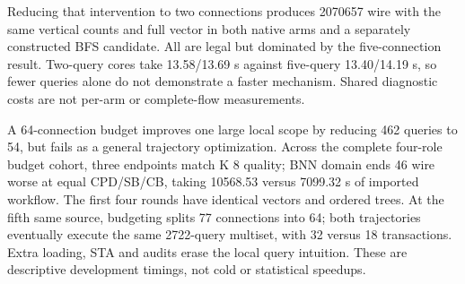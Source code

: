 Reducing that intervention to two connections produces 2070657 wire with the same vertical counts and full vector in both native arms and a separately constructed BFS candidate. All are legal but dominated by the five-connection result. Two-query cores take 13.58/13.69 s against five-query 13.40/14.19 s, so fewer queries alone do not demonstrate a faster mechanism. Shared diagnostic costs are not per-arm or complete-flow measurements.

A 64-connection budget improves one large local scope by reducing 462 queries to 54, but fails as a general trajectory optimization. Across the complete four-role budget cohort, three endpoints match K 8 quality; BNN domain ends 46 wire worse at equal CPD/SB/CB, taking 10568.53 versus 7099.32 s of imported workflow. The first four rounds have identical vectors and ordered trees. At the fifth same source, budgeting splits 77 connections into 64; both trajectories eventually execute the same 2722-query multiset, with 32 versus 18 transactions. Extra loading, STA and audits erase the local query intuition. These are descriptive development timings, not cold or statistical speedups.

